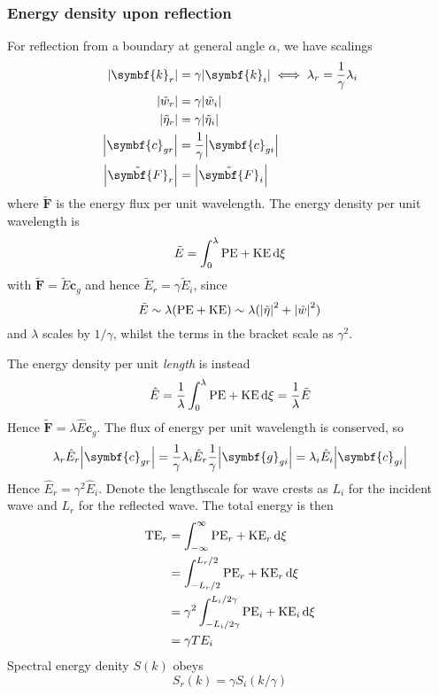 \documentclass{jknotes}
\begin{document}
\subsubsection{Energy density upon reflection}
For reflection from a boundary at general angle $\alpha$, we have scalings
\begin{align}
	\abs{\symbf{k}_r} &= \gamma \abs{\symbf{k}_i} \iff \lambda_r =
		\frac{1}{\gamma} \lambda_i \\
	\abs{\tilde{w}_r} &= \gamma \abs{\tilde{w}_i} \\
	\abs{\tilde{\eta}_r} &= \gamma \abs{\tilde{\eta}_i} \\
	\abs{\symbf{c}_{gr}} &= \frac{1}{\gamma} \abs{\symbf{c}_{gi}}\\
	\abs{\tilde{\symbf{F}}_r} &= \abs{\tilde{\symbf{F}}_i}
\end{align}
where $\tilde{\symbf{F}}$ is the energy flux per unit wavelength. The energy
density per unit wavelength is
\begin{equation}
	\tilde{E} = \int_0^\lambda \text{PE} + \text{KE} \, \diffd \xi
\end{equation}
with $\tilde{\symbf{F}} = \tilde{E} \symbf{c}_g$ and hence $\tilde{E}_r =
\gamma \tilde{E}_i$, since
\begin{equation}
	\tilde{E} \sim \lambda (\text{PE} + \text{KE}) \sim \lambda
	(\abs{\tilde{\eta}}^2 + \abs{\tilde{w}}^2)
\end{equation}
and $\lambda$ scales by $1/\gamma$, whilst the terms in the bracket scale as
$\gamma^2$. 

The energy density per unit \emph{length} is instead
\begin{equation}
	\hat{E} = \frac{1}{\lambda} \int_0^\lambda \text{PE} + \text{KE} \, \diffd
	\xi = \frac{1}{\lambda} \tilde{E}
\end{equation}
Hence $\tilde{\symbf{F}} = \lambda \hat{E} \symbf{c}_g$. The flux of energy
per unit wavelength is conserved, so
\begin{equation}
	\lambda_r \hat{E}_r \abs{\symbf{c}_{gr}} = \frac{1}{\gamma} \lambda_i
	\hat{E}_r \frac{1}{\gamma} \abs{\symbf{g}_{gi}} = \lambda_i \hat{E}_i
	\abs{\symbf{c}_{gi}}
\end{equation}
Hence $\hat{E}_r = \gamma^2 \hat{E}_i$. Denote the lengthscale for wave crests
as $L_i$ for the incident wave and $L_r$ for the reflected wave. The total
energy is then
\begin{align}
	\text{TE}_r &= \int_{-\infty}^\infty \text{PE}_r + \text{KE}_r \, \diffd
	\xi \\
				&= \int_{-L_r/2}^{L_r/2} \text{PE}_r + \text{KE}_r \, \diffd
				\xi \\
				&= \gamma^2 \int_{-L_i/2\gamma}^{L_i/2\gamma}
				\text{PE}_i+\text{KE}_i \, \diffd \xi \\
				&= \gamma T E_i
\end{align}
Spectral energy denity $S(k)$ obeys
\begin{equation}
	S_r(k) = \gamma S_i(k/\gamma)
\end{equation}
\end{document}
